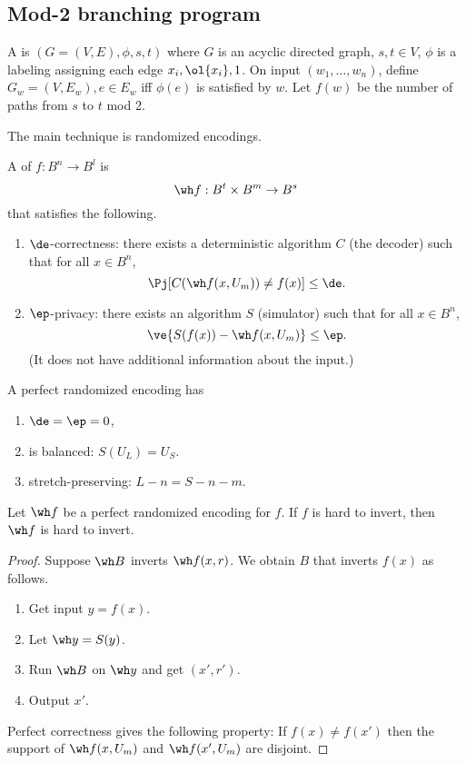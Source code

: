 \subsection{Mod-2 branching program}

\begin{df}
A  is $(G=(V,E),\phi,s,t)$ 
where $G$ is an acyclic directed graph, $s,t\in V$, $\phi$ is a labeling assigning each edge $x_i,\ol{x_i}, 1$. On input $(w_1,\ldots, w_n)$, define $G_w=(V,E_w),e\in E_w$ iff $\phi(e)$ is satisfied by $w$. 
Let $f(w)$ be the number of paths from $s$ to $t$ mod 2. 
\end{df}

The main technique is randomized encodings.
\begin{df}
A  of $f:B^n\to B^l$ is 
\[
\wh f:B^t\times B^m\to B^s
\]
that satisfies the following.
\begin{enumerate}
\item
$\de$-correctness: there exists a deterministic algorithm $C$ (the decoder) such that for all $x\in B^n$, 
\[
\Pj[C(\wh f(x,U_m))\ne f(x)]\le \de.
\]
\item $\ep$-privacy: there exists an algorithm $S$ (simulator) such that for all $x\in B^n$, 
\[
\ve{S(f(x))-\wh f(x,U_m)}\le \ep.
\]
(It does not have additional information about the input.)
\end{enumerate}
A perfect randomized encoding has 
\begin{enumerate}
\item
$\de=\ep=0$,
\item
is balanced: $S(U_L)=U_S$.
\item 
stretch-preserving: $L-n=S-n-m$.
\end{enumerate}
\end{df}
\begin{lem}
Let $\wh f$ be a perfect randomized encoding for $f$. If $f$ is hard to invert, then $\wh f$ is hard to invert.
\end{lem}
\begin{proof}
Suppose $\wh B$ inverts $\wh f(x,r)$. We obtain $B$ that inverts $f(x)$ as follows.
\begin{enumerate}
\item
Get input $y=f(x)$.
\item  Let $\wh y=S(y)$. 
\item Run $\wh B$ on $\wh y$ and get $(x',r')$.
\item Output $x'$.
\end{enumerate}
Perfect correctness gives the following property: If $f(x)\ne f(x')$ then the support of $\wh f(x,U_m)$ and $\wh f(x',U_m)$ are disjoint.
\end{proof}

